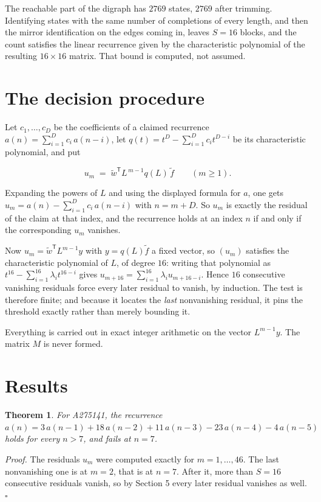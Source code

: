 \documentclass[11pt]{article}
\newtheorem{theorem}{Theorem}
\theoremstyle{definition}
\begin{document}
The reachable part of the digraph has $2769$ states, $2769$ after trimming. Identifying states with the same number of completions of every length, and then the mirror identification on the edges coming in, leaves $S = 16$ blocks, and the count satisfies the linear recurrence given by the characteristic polynomial of the resulting $16\times16$ matrix. That bound is computed, not assumed.

\section{The decision procedure}

Let $c_1,\dots,c_D$ be the coefficients of a claimed recurrence $a(n) = \sum_{i=1}^{D} c_i\,a(n-i)$, let $q(t) = t^{D} - \sum_{i=1}^{D} c_i t^{D-i}$ be its characteristic polynomial, and put

\[u_m \;=\; \tilde w^{\mathsf T} L^{\,m-1} q(L)\,\tilde f \qquad (m \ge 1).\]

Expanding the powers of $L$ and using the displayed formula for $a$, one gets $u_m = a(n) - \sum_{i=1}^{D} c_i\,a(n-i)$ with $n = m + D$. So $u_m$ is exactly the residual of the claim at that index, and the recurrence holds at an index $n$ if and only if the corresponding $u_m$ vanishes.

Now $u_m = \tilde w^{\mathsf T} L^{m-1} y$ with $y = q(L)\tilde f$ a fixed vector, so $(u_m)$ satisfies the characteristic polynomial of $L$, of degree $16$: writing that polynomial as $t^{16} - \sum_{i=1}^{16} \lambda_i t^{16-i}$ gives $u_{m+16} = \sum_{i=1}^{16} \lambda_i u_{m+16-i}$. Hence $16$ consecutive vanishing residuals force every later residual to vanish, by induction. The test is therefore finite; and because it locates the {\itshape last} nonvanishing residual, it pins the threshold exactly rather than merely bounding it.

Everything is carried out in exact integer arithmetic on the vector $L^{m-1}y$. The matrix $M$ is never formed.

\section{Results}

\begin{theorem} For A275141, the recurrence $a(n) = 3\,a(n-1) + 18\,a(n-2) + 11\,a(n-3) - 23\,a(n-4) - 4\,a(n-5)$ holds for every $n > 7$, and fails at $n = 7$.\end{theorem}

{\itshape Proof.} The residuals $u_m$ were computed exactly for $m = 1,\dots,46$. The last nonvanishing one is at $m = 2$, that is at $n = 7$. After it, more than $S = 16$ consecutive residuals vanish, so by Section 5 every later residual vanishes as well. $\square$
\end{document}
